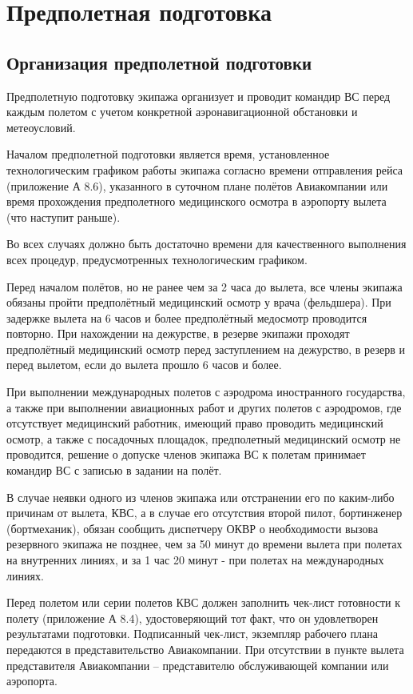 \section{Предполетная подготовка}

\subsection{Организация предполетной подготовки}


Предполетную подготовку экипажа организует и проводит командир ВС перед каждым полетом с учетом конкретной аэронавигационной обстановки и метеоусловий.

Началом предполетной подготовки является время, установленное технологическим графиком работы экипажа согласно времени отправления рейса (приложение А 8.6), указанного в суточном плане полётов Авиакомпании или время прохождения предполетного медицинского осмотра в аэропорту вылета (что наступит раньше).

Во всех случаях должно быть достаточно времени для качественного выполнения всех процедур, предусмотренных технологическим графиком.

Перед началом полётов, но не ранее чем за 2 часа до вылета, все члены экипажа обязаны пройти предполётный медицинский осмотр у врача (фельдшера). При задержке вылета на 6 часов и более предполётный медосмотр проводится повторно. При нахождении на дежурстве, в резерве экипажи проходят предполётный медицинский осмотр перед заступлением на дежурство, в резерв и перед вылетом, если до вылета прошло 6 часов и более.

При выполнении международных полетов с аэродрома иностранного государства, а также при выполнении авиационных работ и других полетов с аэродромов, где отсутствует медицинский работник, имеющий право проводить медицинский осмотр, а также с посадочных площадок, предполетный медицинский осмотр не проводится, решение о допуске членов экипажа ВС к полетам принимает командир ВС с записью в задании на полёт.

В случае неявки одного из членов экипажа или отстранении его по каким-либо причинам от вылета, КВС, а в случае его отсутствия второй пилот, бортинженер (бортмеханик), обязан сообщить диспетчеру ОКВР о необходимости вызова резервного экипажа не позднее, чем за 50 минут до времени вылета при полетах на внутренних линиях, и за 1 час 20 минут - при полетах на международных линиях.

Перед полетом или серии полетов КВС должен заполнить чек-лист готовности к полету (приложение А 8.4), удостоверяющий тот факт, что он удовлетворен результатами подготовки.
Подписанный чек-лист, экземпляр рабочего плана передаются в представительство Авиакомпании.
При отсутствии в пункте вылета представителя Авиакомпании – представителю обслуживающей компании или аэропорта.

